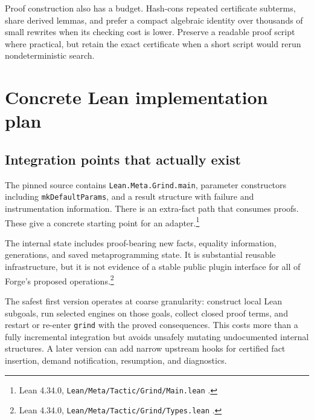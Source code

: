\documentclass[11pt,a4paper]{article}
\newcommand{\code}[1]{\texttt{#1}}
\begin{document}
Proof construction also has a budget. Hash-cons repeated certificate subterms,
share derived lemmas, and prefer a compact algebraic identity over thousands of
small rewrites when its checking cost is lower. Preserve a readable proof
script where practical, but retain the exact certificate when a short script
would rerun nondeterministic search.

\section{Concrete Lean implementation plan}
\label{sec:implementation}

\subsection{Integration points that actually exist}
The pinned source contains \code{Lean.Meta.Grind.main}, parameter constructors
including \code{mkDefaultParams}, and a result structure with failure and
instrumentation information. There is an extra-fact path that consumes proofs.
These give a concrete starting point for an adapter.\footnote{Lean 4.34.0,
\code{Lean/Meta/Tactic/Grind/Main.lean} \cite{grindmain}.}

The internal state includes proof-bearing new facts, equality information,
generations, and saved metaprogramming state. It is substantial reusable
infrastructure, but it is not evidence of a stable public plugin interface for
all of Forge's proposed operations.\footnote{Lean 4.34.0,
\code{Lean/Meta/Tactic/Grind/Types.lean} \cite{grindtypes}.}

The safest first version operates at coarse granularity: construct local Lean
subgoals, run selected engines on those goals, collect closed proof terms, and
restart or re-enter \code{grind} with the proved consequences. This costs more
than a fully incremental integration but avoids unsafely mutating undocumented
internal structures. A later version can add narrow upstream hooks for
certified fact insertion, demand notification, resumption, and diagnostics.
\end{document}
